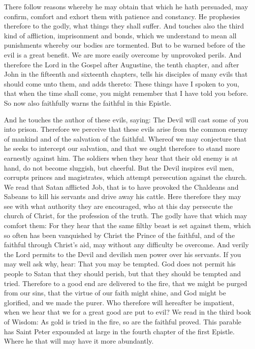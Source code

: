 There follow reasons whereby he may obtain that which he hath persuaded, may confirm, comfort and exhort them with patience and constancy. He prophesies therefore to the godly, what things they shall suffer. And touches also the third kind of affliction, imprisonment and bonds, which we understand to mean all punishments whereby our bodies are tormented. But to be warned before of the evil is a great benefit. We are more easily overcome by unprovoked perils. And therefore the Lord in the Gospel after Augustine, the tenth chapter, and after John in the fifteenth and sixteenth chapters, tells his disciples of many evils that should come unto them, and adds thereto: These things have I spoken to you, that when the time shall come, you might remember that I have told you before. So now also faithfully warns the faithful in this Epistle.

And he touches the author of these evils, saying: The Devil will cast some of you into prison. Therefore we perceive that these evils arise from the common enemy of mankind and of the salvation of the faithful. Whereof we may conjecture that he seeks to intercept our salvation, and that we ought therefore to stand more earnestly against him. The soldiers when they hear that their old enemy is at hand, do not become sluggish, but cheerful. But the Devil inspires evil men, corrupts princes and magistrates, which attempt persecution against the church. We read that Satan afflicted Job, that is to have provoked the Chaldeans and Sabeans to kill his servants and drive away his cattle. Here therefore they may see with what authority they are encouraged, who at this day persecute the church of Christ, for the profession of the truth. The godly have that which may comfort them: For they hear that the same filthy beast is set against them, which so often has been vanquished by Christ the Prince of the faithful, and of the faithful through Christ's aid, may without any difficulty be overcome. And verily the Lord permits to the Devil and devilish men power over his servants. If you may well ask why, hear: That you may be tempted. God does not permit his people to Satan that they should perish, but that they should be tempted and tried. Therefore to a good end are delivered to the fire, that we might be purged from our sins, that the virtue of our faith might shine, and God might be glorified, and we made the purer. Who therefore will hereafter be impatient, when we hear that we for a great good are put to evil? We read in the third book of Wisdom: As gold is tried in the fire, so are the faithful proved. This parable has Saint Peter expounded at large in the fourth chapter of the first Epistle. Where he that will may have it more abundantly.

